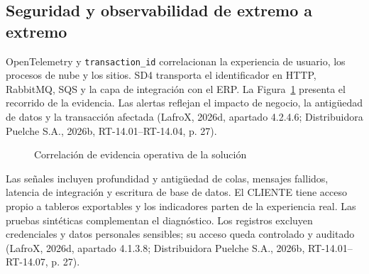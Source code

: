 
\subsection{Seguridad y observabilidad de extremo a extremo}
\label{sub:sd10-observabilidad}

OpenTelemetry y \texttt{transaction\_id} correlacionan la experiencia de usuario, los procesos de nube y los sitios. SD4 transporta el identificador en HTTP, RabbitMQ, SQS y la capa de integración con el ERP. La Figura~\ref{fig:sd10-evidencia} presenta el recorrido de la evidencia. Las alertas reflejan el impacto de negocio, la antigüedad de datos y la transacción afectada (LafroX, 2026d, apartado 4.2.4.6; Distribuidora Puelche S.A., 2026b, RT-14.01--RT-14.04, p. 27).

\begin{figure}[htbp]
\centering
{}
\caption{Correlación de evidencia operativa de la solución}
\label{fig:sd10-evidencia}
\end{figure}

Las señales incluyen profundidad y antigüedad de colas, mensajes fallidos, latencia de integración y escritura de base de datos. El CLIENTE tiene acceso propio a tableros exportables y los indicadores parten de la experiencia real. Las pruebas sintéticas complementan el diagnóstico. Los registros excluyen credenciales y datos personales sensibles; su acceso queda controlado y auditado (LafroX, 2026d, apartado 4.1.3.8; Distribuidora Puelche S.A., 2026b, RT-14.01--RT-14.07, p. 27).

